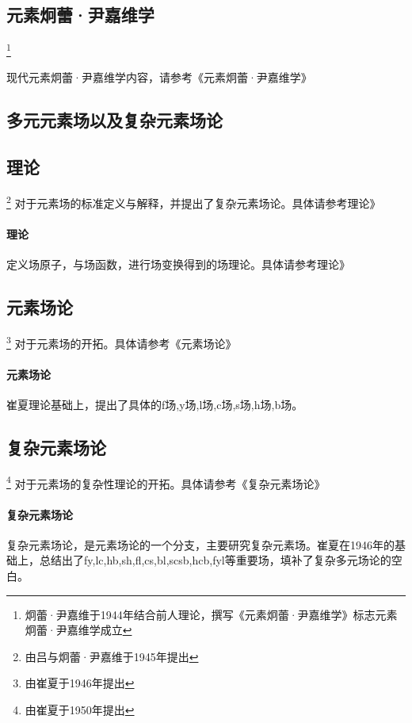 \documentclass[12pt,a4paper]{article}%
\begin{document}
\subsection{元素炯蕾·尹嘉维学}	\footnote[23]{炯蕾·尹嘉维于1944年结合前人理论，撰写《元素炯蕾·尹嘉维学》标志元素炯蕾·尹嘉维学成立}

现代元素炯蕾·尹嘉维学内容，请参考《元素炯蕾·尹嘉维学》

		\begin{center}
			\section{多元元素场以及复杂元素场论}
		\end{center}
	\subsection{理论}	\footnote[24]{由吕与炯蕾·尹嘉维于1945年提出}
		对于元素场的标准定义与解释，并提出了复杂元素场论。具体请参考理论》
		\paragraph{理论}
		定义场原子，与场函数，进行场变换得到的场理论。具体请参考理论》
	\subsection{元素场论}	\footnote[25]{由崔夏于1946年提出}
		对于元素场的开拓。具体请参考《元素场论》
		\paragraph{元素场论} 
		崔夏理论基础上，提出了具体的f场,y场,l场,c场,s场,h场,b场。

	\subsection{复杂元素场论}	\footnote[25]{由崔夏于1950年提出}
		对于元素场的复杂性理论的开拓。具体请参考《复杂元素场论》
\paragraph{复杂元素场论} 复杂元素场论，是元素场论的一个分支，主要研究复杂元素场。崔夏在1946年的基础上，总结出了fy,lc,hb,sh,fl,cs,bl,scsb,hcb,fyl等重要场，填补了复杂多元场论的空白。
\end{document}
